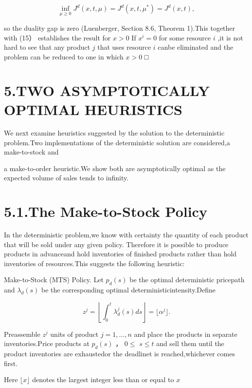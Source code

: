 \[
\operatorname* { i n f } _ { \mu \geqslant 0 } J ^ { d } ( x , t , \mu ) = J ^ { d } ( x , t , \mu ^ { \ast } ) = J ^ { d } ( x , t ) ,
\]

so the duality gap is zero (Luenberger, Section 8.6, Theorem 1).This
together with (15） establishes the result for \(x > 0\) If
\(x ^ { i } = 0\) for some resource \(i\) ,it is not hard to see that
any product \(j\) that uses resource \(i\) canbe eliminated and the
problem can be reduced to one in which \(x > 0\) □

\section{5.TWO ASYMPTOTICALLY OPTIMAL
HEURISTICS}\label{two-asymptotically-optimal-heuristics}

We next examine heuristics suggested by the solution to the
deterministic problem.Two implementations of the deterministic solution
are considered,a make-to-stock and

a make-to-order heuristic.We show both are asymptotically optimal as the
expected volume of sales tends to infinity.

\section{5.1.The Make-to-Stock Policy}\label{the-make-to-stock-policy}

In the deterministic problem,we know with certainty the quantity of each
product that will be sold under any given policy. Therefore it is
possible to produce products in advanceand hold inventories of finished
products rather than hold inventories of resources.This suggests the
following heuristic:

Make-to-Stock (MTS) Policy. Let \(p _ { d } ( s )\) be the optimal
deterministic pricepath and \(\lambda _ { d } ( s )\) be the
corresponding optimal deterministicintensity.Define

\[
z ^ { j } = \left\lfloor \int _ { 0 } ^ { t } \lambda _ { d } ^ { j } ( s ) d s \right\rfloor = \lfloor \alpha ^ { j } \rfloor .
\]

Preassemble \(z ^ { j }\) units of product \(j = 1 , \ldots , n\) and
place the products in separate inventories.Price products at
\(p _ { d } ( s )\) ， \(0 \leqslant\) \(s \leqslant t\) and sell them
until the product inventories are exhaustedor the deadlinet is
reached,whichever comes first.

Here \(\lfloor x \rfloor\) denotes the largest integer less than or
equal to \(x\)

